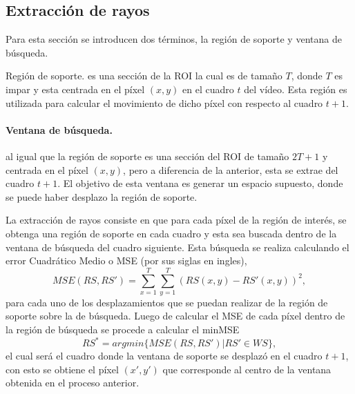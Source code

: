 	\subsection{Extracción de rayos}
	\label{algoritmo:ext_rayos}
	
	Para esta sección se introducen dos términos, la región de soporte y ventana de búsqueda.
	\begin{definition}	
	{Región de soporte.} es una sección de la ROI la cual es de tamaño $T$, donde $T$ es impar y esta centrada en el píxel $(x,y)$ en el cuadro $t$ del vídeo. Esta región es utilizada para calcular el movimiento de dicho píxel con respecto al cuadro $t+1$.
	\end{definition}
	\paragraph{Ventana de búsqueda.} al igual que la región de soporte es una sección del ROI de tamaño $2T+1$ y centrada en el píxel $(x,y)$, pero a diferencia de la anterior, esta se extrae del cuadro $t+1$. El objetivo de esta ventana es generar un espacio supuesto, donde se puede haber desplazo la región de soporte.
		
	La extracción de rayos consiste en que para cada píxel de la región de interés, se obtenga una región de soporte en cada cuadro y esta sea buscada dentro de la ventana de búsqueda del cuadro siguiente. Esta búsqueda se realiza calculando el error Cuadrático Medio o MSE (por sus siglas en ingles), \begin{equation}\label{algoritmo:eq:mse}	
			MSE(\mathit{RS},\mathit{RS'}) = \sum_{x=1}^{T} \sum_{y=1}^{T} (\mathit{RS}(x,y) - \mathit{RS'}(x,y))^2,
		\end{equation} 
	para cada uno de los desplazamientos que se puedan realizar de la región de soporte sobre la de búsqueda. Luego de calcular el MSE de cada píxel dentro de la región de búsqueda se procede a calcular el minMSE
	\begin{equation}
		RS^* = argmin\{MSE(RS,RS') | RS' \in WS\},
	\end{equation}		
	el cual será el cuadro donde la ventana de soporte se desplazó en el cuadro $t+1$, con esto se obtiene el píxel $(x',y')$ que corresponde al centro de la ventana obtenida en el proceso anterior.
	
